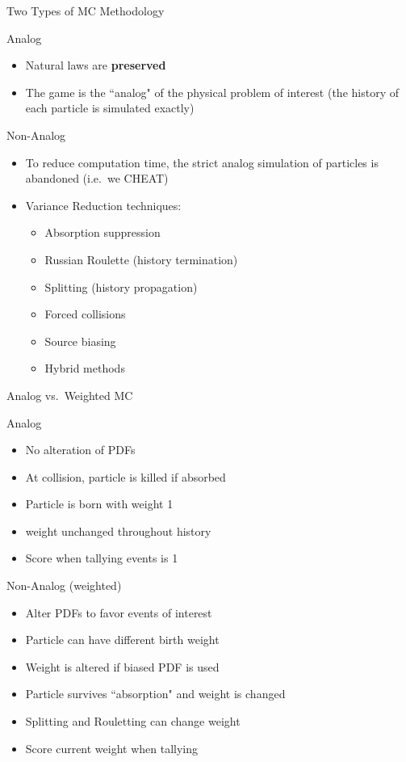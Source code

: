\documentclass[xcolor=x11names,compress, handout]{beamer}
\renewcommand{\(}{\begin{columns}}
\renewcommand{\)}{\end{columns}}
\newcommand{\<}[1]{\begin{column}{#1}}
\renewcommand{\>}{\end{column}}
\begin{document}
\begin{frame}{Two Types of MC Methodology}

\alert{Analog}
\begin{itemize}
    \item Natural laws are \textbf{preserved}
    \item The game is the ``analog" of the physical problem of interest (the history of each particle is simulated exactly)
\end{itemize}
\pause

\alert{Non-Analog}
\begin{itemize}
    \item To reduce computation time, the strict analog simulation of particles is abandoned (i.e.\ we CHEAT)
    \item Variance Reduction techniques:
    \begin{itemize}
    \item Absorption suppression
    \item Russian Roulette (history termination)
    \item Splitting (history propagation)
    \item Forced collisions
    \item Source biasing
    \item Hybrid methods
    \end{itemize}
    \end{itemize}

\end{frame}


\begin{frame}{Analog vs.\ Weighted MC}

\alert{Analog}
\begin{itemize}
    \item No alteration of PDFs
    \item At collision, particle is killed if absorbed
    \item Particle is born with weight 1
    \item weight unchanged throughout history
    \item Score when tallying events is 1
\end{itemize}
\pause

\alert{Non-Analog} (weighted)
\begin{itemize}
    \item Alter PDFs to favor events of interest
    \item Particle can have different birth weight
    \item Weight is altered if biased PDF is used
    \item Particle survives ``absorption" and weight is changed
    \item Splitting and Rouletting can change weight
    \item Score current weight when tallying
    \end{itemize}

\end{frame}
\end{document}
